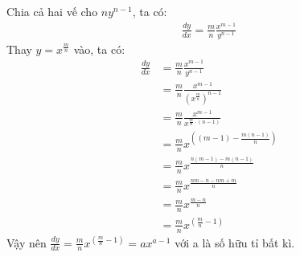 \documentclass[12pt,a4paper]{article}
\begin{document}
Chia cả hai vế cho $n y^{n-1}$, ta có:
\begin{align*}
	\frac{dy}{dx} = \frac{m}{n} \frac{x^{m-1}}{y^{n-1}}
\end{align*}
Thay $y = x^{\frac{m}{n}}$ vào, ta có:
\begin{align*}
	\frac{dy}{dx} &= \frac{m}{n} \frac{x^{m-1}}{y^{n-1}}\\
	&= \frac{m}{n} \frac{x^{m-1}}{(x^{\frac{m}{n}})^{n-1}}\\
	&= \frac{m}{n} \frac{x^{m-1}}{x^{\frac{m}{n} \cdot (n-1)}}\\
	&= \frac{m}{n} x^{\left((m-1) - \frac{m (n-1)}{n}\right)}\\
	&= \frac{m}{n} x^{\frac{n (m-1) - m (n-1)}{n}}\\
	&= \frac{m}{n} x^{\frac{nm - n - nm + m}{n}}\\
	&= \frac{m}{n} x^{\frac{m - n}{n}}\\
	&= \frac{m}{n} x^{\left(\frac{m}{n} - 1\right)}
\end{align*}
Vậy nên $\frac{dy}{dx} = \frac{m}{n} x^{\left(\frac{m}{n} - 1\right)} = a x^{a - 1}$ với a là số hữu tỉ bất kì.
\end{document}
